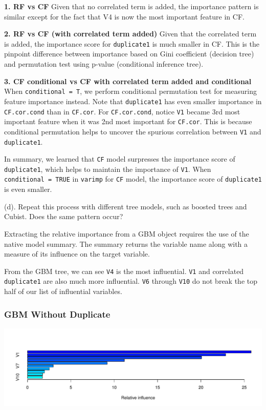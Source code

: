 \documentclass[]{report}
\begin{document}
\textbf{1. RF vs CF } Given that no correlated term is added, the
importance pattern is similar except for the fact that V4 is now the
most important feature in CF.

\textbf{2. RF vs CF (with correlated term added)} Given that the
correlated term is added, the importance score for \texttt{duplicate1}
is much smaller in CF. This is the pinpoint difference between
importance based on Gini coefficient (decision tree) and permutation
test using p-value (conditional inference tree).

\textbf{3. CF conditional vs CF with correlated term added and
conditional} When \texttt{conditional\ =\ T}, we perform conditional
permutation test for measuring feature importance instead. Note that
\texttt{duplicate1} has even smaller importance in \texttt{CF.cor.cond}
than in \texttt{CF.cor}. For \texttt{CF.cor.cond}, notice \texttt{V1}
became 3rd most important feature when it was 2nd most important for
\texttt{CF.cor}. This is because conditional permutation helps to
uncover the spurious correlation between \texttt{V1} and
\texttt{duplicate1}.

In summary, we learned that \texttt{CF} model surpresses the importance
score of \texttt{duplicate1}, which helps to maintain the importance of
\texttt{V1}. When \texttt{conditional\ =\ TRUE} in \texttt{varimp} for
\texttt{CF} model, the importance score of \texttt{duplicate1} is even
smaller.

\begin{subquestion}{(d).} Repeat this process with different tree models, such as boosted trees and Cubist. Does the same pattern occur?\end{subquestion}

Extracting the relative importance from a GBM object requires the use of
the native model summary. The summary returns the variable name along
with a measure of its influence on the target variable.

From the GBM tree, we can see \texttt{V4} is the most influential.
\texttt{V1} and correlated \texttt{duplicate1} are also much more
influential. \texttt{V6} through \texttt{V10} do not break the top half
of our list of influential variables.

\subsubsection{GBM Without Duplicate}\label{gbm-without-duplicate}

\includegraphics{AppliedPredictiveModeling_treebased_regression_files/figure-latex/kj-8.1d-1.pdf}
\end{document}
